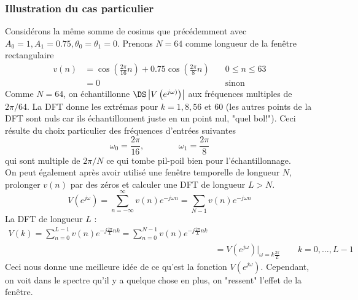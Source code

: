 			\subsubsection{Illustration du cas particulier}
			Considérons la même somme de cosinus que précédemment avec $A_0=1,A_1=0.75, \theta_0=\theta_1
			=0$. Prenons $N=64$ comme longueur de la fenêtre rectangulaire
			\begin{equation}
			\begin{array}{lll}
			v(n) &= \cos\left(\frac{2\pi}{16}n\right)+0.75\cos\left(\frac{2\pi}{8}n\right)&\quad 0\leq n\leq 63\\
			&= 0 &\quad \text{sinon}
			\end{array}
			\end{equation}
			Comme $N=64$, on échantillonne $\DS\left|V\left(e^{j\omega)}\right)\right|$ aux fréquences 
			multiples de $2\pi/64$. La DFT donne les extrémas pour $k=1,8,56$ et 60 (les autres points 
			de la DFT sont nuls car ils échantillonnent juste en un point nul, "quel bol!"). Ceci résulte 
			du choix particulier des fréquences d'entrées suivantes
			\begin{equation}
			\omega_0 = \frac{2\pi}{16},\qquad\qquad \omega_1=\dfrac{2\pi}{8}
			\end{equation}
			qui sont multiple de $2\pi/N$ ce qui tombe pil-poil bien pour l'échantillonnage. \\
			
			On peut également après avoir utilisé une fenêtre temporelle de longueur $N$, prolonger 
			$v(n)$ par des zéros et calculer une DFT de longueur $L>N$.
			\begin{equation}
			V(e^{j\omega}) = \sum_{n=-\infty}^\infty v(n) e^{-j\omega n} = \sum_{N-1} v(n)e^{-j\omega n}
			\end{equation}
			La DFT de longueur $L$ :
			\begin{equation}
			\begin{array}{ll}
			V(k) = \sum_{n=0}^{L-1} v(n)e^{-j\frac{2\pi}{L}nk} = \sum_{n=0}^{N-1} v(n)e^{-j\frac{2\pi}{L}
			nk}\\
			&= V(e^{j\omega})|_{\omega=k\frac{2\pi}{L}}\qquad k=0,\dots,L-1
			\end{array}
			\end{equation}
			Ceci nous donne une meilleure idée de ce qu'est la fonction $V(e^{j\omega})$. Cependant, on voit 
			dans le spectre qu'il y a quelque chose en plus, on "ressent" l'effet de la fenêtre.\\
			
